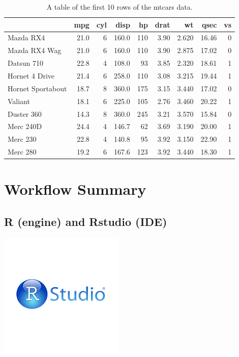 \documentclass[
]{book}
\begin{document}
\begin{table}

\caption{\label{tab:unnamed-chunk-7}A table of the first 10 rows of the mtcars data.}
\centering
\begin{tabular}[t]{lrrrrrrrr}
\toprule
  & mpg & cyl & disp & hp & drat & wt & qsec & vs\\
\midrule
Mazda RX4 & 21.0 & 6 & 160.0 & 110 & 3.90 & 2.620 & 16.46 & 0\\
Mazda RX4 Wag & 21.0 & 6 & 160.0 & 110 & 3.90 & 2.875 & 17.02 & 0\\
Datsun 710 & 22.8 & 4 & 108.0 & 93 & 3.85 & 2.320 & 18.61 & 1\\
Hornet 4 Drive & 21.4 & 6 & 258.0 & 110 & 3.08 & 3.215 & 19.44 & 1\\
Hornet Sportabout & 18.7 & 8 & 360.0 & 175 & 3.15 & 3.440 & 17.02 & 0\\
\addlinespace
Valiant & 18.1 & 6 & 225.0 & 105 & 2.76 & 3.460 & 20.22 & 1\\
Duster 360 & 14.3 & 8 & 360.0 & 245 & 3.21 & 3.570 & 15.84 & 0\\
Merc 240D & 24.4 & 4 & 146.7 & 62 & 3.69 & 3.190 & 20.00 & 1\\
Merc 230 & 22.8 & 4 & 140.8 & 95 & 3.92 & 3.150 & 22.90 & 1\\
Merc 280 & 19.2 & 6 & 167.6 & 123 & 3.92 & 3.440 & 18.30 & 1\\
\bottomrule
\end{tabular}
\end{table}

\hypertarget{workflow-summary}{%
\chapter{Workflow Summary}\label{workflow-summary}}

\hypertarget{r-engine-and-rstudio-ide}{%
\section{R (engine) and Rstudio (IDE)}\label{r-engine-and-rstudio-ide}}

\begin{center}\includegraphics{_images/rstudio} \end{center}
\end{document}

